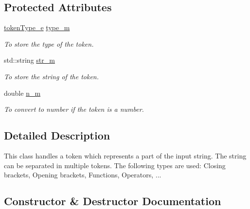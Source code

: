 \subsection*{Protected Attributes}
\begin{DoxyCompactItemize}
\item 
\hypertarget{class_token_a881316b1f7990524969817f25f80feae}{}\hyperlink{class_token_a706d105bff3282a406a9b218fcee1bfc}{token\+Type\+\_\+e} \hyperlink{class_token_a881316b1f7990524969817f25f80feae}{type\+\_\+m}\label{class_token_a881316b1f7990524969817f25f80feae}

\begin{DoxyCompactList}\small\item\em To store the type of the token. \end{DoxyCompactList}\item 
\hypertarget{class_token_a2781f7d67fae2fa1cbfe4af5caf8473d}{}std\+::string \hyperlink{class_token_a2781f7d67fae2fa1cbfe4af5caf8473d}{str\+\_\+m}\label{class_token_a2781f7d67fae2fa1cbfe4af5caf8473d}

\begin{DoxyCompactList}\small\item\em To store the string of the token. \end{DoxyCompactList}\item 
\hypertarget{class_token_ab5e62028b935156e5f69f3a50b20c078}{}double \hyperlink{class_token_ab5e62028b935156e5f69f3a50b20c078}{n\+\_\+m}\label{class_token_ab5e62028b935156e5f69f3a50b20c078}

\begin{DoxyCompactList}\small\item\em To convert to number if the token is a number. \end{DoxyCompactList}\end{DoxyCompactItemize}


\subsection{Detailed Description}
This class handles a token which represents a part of the input string. The string can be separated in multiple tokens. The following types are used\+: Closing brackets, Opening brackets, Functions, Operators, ... 

\subsection{Constructor \& Destructor Documentation}
\hypertarget{class_token_ad84c27d6c4587fd359ffa52004bd370b}{}
